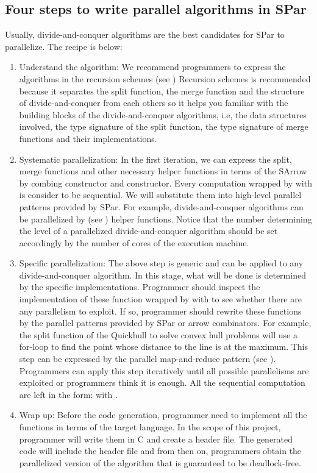 \subsection{Four steps to write parallel algorithms in SPar}
Usually, divide-and-conquer algorithms are the best candidates for SPar to parallelize. The recipe is below:
\begin{enumerate}
    \item Understand the algorithm: We recommend programmers to express the algorithms in the recursion schemes (see ) Recursion schemes is recommended because it separates the split function, the merge function and the structure of divide-and-conquer from each others so it helps you familiar with the building blocks of the divide-and-conquer algorithms, i.e, the data structures involved, the type signature of the split function, the type signature of merge functions and their implementations.
    \item Systematic parallelization: In the first iteration, we can express the split, merge functions and other necessary helper functions in terms of the SArrow by combing  constructor and  constructor. Every computation wrapped by  with  is consider to be sequential. We will substitute them into high-level parallel patterns provided by SPar. For example, divide-and-conquer algorithms can be parallelized by  (see ) helper functions. Notice that the number determining the level of a parallelized divide-and-conquer algorithm should be set accordingly by the number of cores of the execution machine.
    \item Specific parallelization: The above step is generic and can be applied to any divide-and-conquer algorithm. In this stage, what will be done is determined by the specific implementations. Programmer should inspect the implementation of these function wrapped by  with  to see whether there are any parallelism to exploit. If so, programmer should rewrite these functions by the parallel patterns provided by SPar or arrow combinators. For example, the split function of the Quickhull \cite{Quickhull2019} to solve convex hull problems will use a for-loop to find the point whose distance to the line is at the maximum. This step can be expressed by the parallel map-and-reduce pattern (see ). Programmers can apply this step iteratively until all possible parallelisms are exploited or programmers think it is enough. All the sequential computation are left in the form:  with .
    \item Wrap up: Before the code generation, programmer need to implement all the  functions in terms of the target language. In the scope of this project, programmer will write them in C and create a header file. The generated code will include the header file and from then on, programmers obtain the parallelized version of the algorithm that is guaranteed to be deadlock-free.
\end{enumerate}
